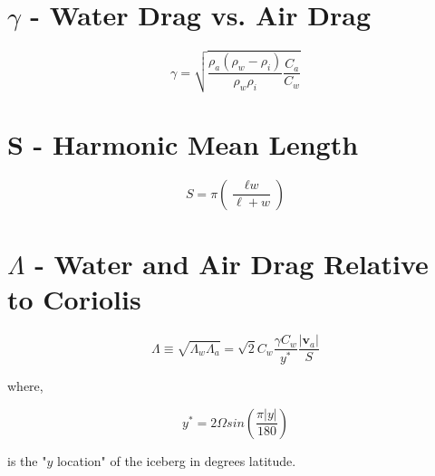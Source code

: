 \documentclass[12pt]{article}
\begin{document}
\section{$\gamma$ - Water Drag vs. Air Drag}

\begin{equation}
\gamma = \sqrt{\dfrac{\rho_a(\rho_w - \rho_i)}{\rho_w\rho_i}\dfrac{C_a}{C_w}}
\end{equation}

\section{S - Harmonic Mean Length}

\begin{equation}
S = \pi(\dfrac{\ell\textit{w}}{\ell+\textit{w}})
\end{equation}

\section{$\Lambda$ - Water and Air Drag Relative to Coriolis}

\begin{equation}
\Lambda \equiv \sqrt{\Lambda_w\Lambda_a} = 
\sqrt{2}C_w\dfrac{\gamma C_w}{y^*}\dfrac{|\textbf{v}_a|}{S}
\end{equation}

where,

\begin{equation}
y^* = 2 \Omega sin(\dfrac{\pi |y|}{180})
\end{equation}

is the "$y$ location" of the iceberg in degrees latitude.
\end{document}
